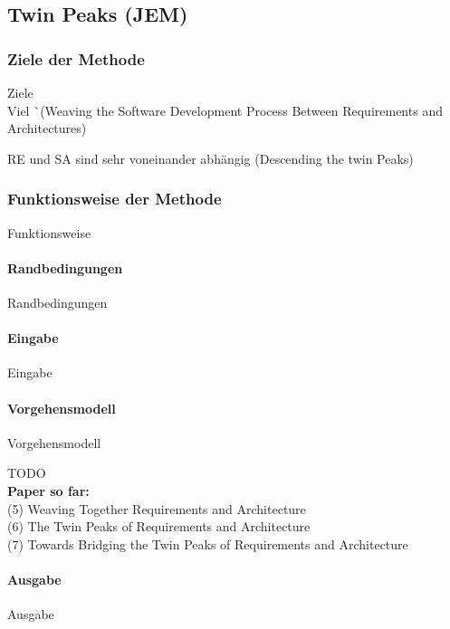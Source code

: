 \subsection{Twin Peaks (JEM)}

\subsubsection{Ziele der Methode}

Ziele \\

Viel ^^ (Weaving the Software Development Process Between Requirements and Architectures)

RE und SA sind sehr voneinander abhängig (Descending the twin Peaks)

\subsubsection{Funktionsweise der Methode}

Funktionsweise

\paragraph{Randbedingungen}

Randbedingungen


\paragraph{Eingabe}

Eingabe


\paragraph{Vorgehensmodell}

Vorgehensmodell

TODO \\


\textbf{Paper so far:} \\
(5) Weaving Together Requirements and Architecture \\
(6) The Twin Peaks of Requirements and Architecture \\
(7) Towards Bridging the Twin Peaks of Requirements and Architecture \\


\paragraph{Ausgabe}

Ausgabe
